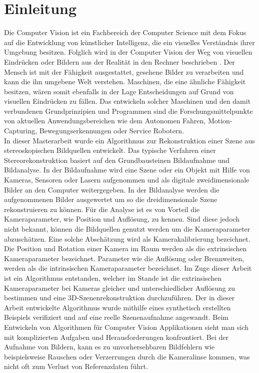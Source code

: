 \chapter{Einleitung}
\label{sec:einleitung} 




Die Computer Vision ist ein Fachbereich der Computer Science mit dem Fokus auf die Entwicklung von künstlicher Intelligenz, die ein visuelles Verständnis ihrer Umgebung besitzen. Folglich wird in der Computer Vision der Weg von visuellen Eindrücken oder Bildern aus der Realität in den Rechner beschrieben \cite{ComputerVision}. Der Mensch ist mit der Fähigkeit ausgestattet, gesehene Bilder zu verarbeiten und  kann die ihn umgebene Welt verstehen. Maschinen, die eine ähnliche Fähigkeit besitzen, wären somit ebenfalls in der Lage Entscheidungen auf Grund von visuellen Eindrücken zu fällen. Das entwickeln solcher Maschinen und den damit verbundenen Grundprinzipien und Programmen sind die Forschungsmittelpunkte von aktuellen Anwendungsbereichen wie dem Autonomen Fahren, Motion-Capturing, Bewegungserkennungen oder Service Robotern.\\

In dieser Masterarbeit wurde ein Algorithmus zur Rekonstruktion einer Szene aus stereoskopischen Bildquellen entwickelt. Das typische Verfahren einer Stereorekonstruktion basiert auf den Grundbausteinen Bildaufnahme und Bildanalyse\cite{ComputerVision}. In der Bildaufnahme wird eine Szene oder ein Objekt mit Hilfe von Kameras, Sensoren oder Lasern aufgenommen und als digitale zweidimensionale Bilder an den Computer weitergegeben. In der Bildanalyse werden die aufgenommenen Bilder ausgewertet um so die dreidimensionale Szene rekonstruieren zu können. Für die Analyse ist es von Vorteil die Kameraparameter, wie Position und Auflösung, zu kennen. Sind diese jedoch nicht bekannt, können die Bildquellen genutzt werden um die Kameraparameter abzuschätzen. Eine solche Abschätzung wird als Kamerakalibrierung\cite{HZ,Ferid,Elements,ZZGXr} bezeichnet. Die Position und Rotation einer Kamera im Raum werden als die extrinsischen Kameraparameter bezeichnet. Parameter wie die Auflösung oder Brennweiten, werden als die intrinsischen Kameraparameter bezeichnet\cite{HZ,Ferid}. Im Zuge dieser Arbeit ist ein Algorithmus entstanden, welcher im Stande ist die extrinsischen Kameraparameter bei Kameras gleicher und unterschiedlicher Auflösung zu bestimmen und eine 3D-Szenenrekonstruktion durchzuführen. Der in dieser Arbeit entwickelte Algorithmus wurde mithilfe eines synthetisch erstellten Beispiels verifiziert und auf eine reelle Szenenaufnahme angewandt. Beim Entwickeln von Algorithmen für Computer Vision Applikationen sieht man sich mit komplizierten Aufgaben und Herausforderungen konfrontiert. Bei der Aufnahme von Bildern, kann es  zu unvorhersehbaren Bildfehlern wie beispielsweise Rauschen oder Verzerrungen durch die Kameralinse kommen, was nicht oft zum Verlust von Referenzdaten führt.\\

